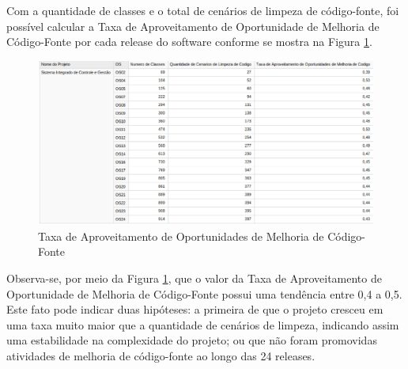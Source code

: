 Com a quantidade de classes e o total de cenários de limpeza de código-fonte, foi possível calcular a Taxa de Aproveitamento de Oportunidade de Melhoria de Código-Fonte por cada release do software conforme se mostra na Figura \ref{fig:taxa-cenarios}.

\begin{figure}[H]
\centering
\includegraphics[keepaspectratio=true,scale=0.38]{figuras/taxa-parcial.eps}
\caption{Taxa de Aproveitamento de Oportunidades de Melhoria de Código-Fonte}
\label{fig:taxa-cenarios}
\end{figure}
\FloatBarrier

Observa-se, por meio da Figura \ref{fig:taxa-cenarios}, que o valor da Taxa de Aproveitamento de Oportunidade de Melhoria de Código-Fonte possui uma tendência entre 0,4 a 0,5. Este fato pode indicar duas hipóteses: a primeira de que o projeto cresceu em uma taxa muito maior que a quantidade de cenários de limpeza, indicando assim uma estabilidade na complexidade do projeto; ou que não foram promovidas atividades de melhoria de código-fonte ao longo das 24 releases.
